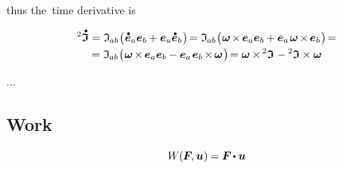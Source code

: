 \vspace{-0.1em}\noindent
thus the~time derivative is

\nopagebreak\vspace{-0.2em}\begin{multline*}
\inertiatensordotabove
= \inertiatensorcomponents{ab} \bigl( \hspace{.1ex} \mathdotabove{\bm{e}}_a \bm{e}_b \hspace{-0.1ex} + \bm{e}_a \mathdotabove{\bm{e}}_b \hspace{.12ex} \bigr) \hspace{-0.33ex}
= \inertiatensorcomponents{ab} \bigl( \hspace{.1ex} \bm{\omega} \hspace{-0.2ex} \times \hspace{-0.2ex} \bm{e}_a \bm{e}_b \hspace{-0.1ex} + \bm{e}_a \hspace{.2ex} \bm{\omega} \hspace{-0.2ex} \times \hspace{-0.2ex} \bm{e}_b \hspace{.12ex} \bigr) \hspace{-0.33ex}
=
\\[-0.1em]
%
= \inertiatensorcomponents{ab} \bigl( \hspace{.1ex} \bm{\omega} \hspace{-0.2ex} \times \hspace{-0.2ex} \bm{e}_a \bm{e}_b \hspace{-0.1ex} - \bm{e}_a \hspace{.2ex} \bm{e}_b \hspace{-0.2ex} \times \hspace{-0.2ex} \bm{\omega} \hspace{.12ex} \bigr) \hspace{-0.33ex}
= \bm{\omega} \hspace{-0.1ex} \times \hspace{-0.1ex} \inertiatensor \hspace{.1ex} - \inertiatensor \times \bm{\omega}
\end{multline*}

...

\subsection*{Work}

\begin{equation*}
W \hspace{-0.12ex} ( \hspace{-0.08ex} \bm{F} \hspace{-0.25ex}, \bm{u} ) \hspace{-0.1ex} = \bm{F} \hspace{-0.2ex} \dotp \bm{u}
\end{equation*}


